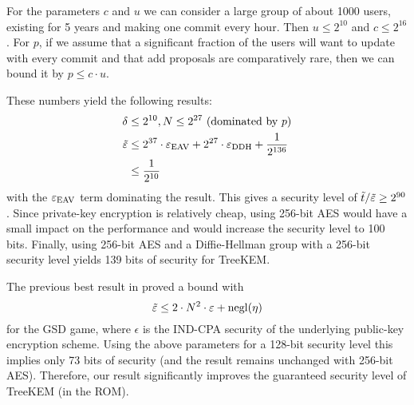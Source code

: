 For the parameters $c$ and $u$ we can consider a large group of about 1000 users, existing for 5 years and making one commit every hour. Then $u \le 2^{10}$ and $c \le 2^{16}$. For $p$, if we assume that a significant fraction of the users will want to update with every commit and that add proposals are comparatively rare, then we can bound it by $p \le c \cdot u$.

These numbers yield the following results:
\begin{align*}
	\delta & \le 2^{10}, N \le 2^{27}                                                      \text{ (dominated by $p$)} \\
	\tilde{\varepsilon}    & \le 2^{37} \cdot \varepsilon_\mathrm{EAV} + 2^{27} \cdot \varepsilon_\mathrm{DDH} + \frac{1}{2^{136}}                                          \\
	       & \le \frac{1}{2^{10}}
\end{align*}
with the $\varepsilon_\mathrm{EAV}$ term dominating the result. This gives a security level of $\tilde{t}/\tilde{\varepsilon} \ge 2^{90}$. Since private-key encryption is relatively cheap, using 256-bit AES would have a small impact on the performance and would increase the security level to 100 bits. Finally, using 256-bit AES and a Diffie-Hellman group with a 256-bit security level yields 139 bits of security for TreeKEM.

The previous best result in \cite[Theorem 3]{ttkem} proved a bound with
\[
	\tilde{\varepsilon} \le 2 \cdot N^2 \cdot \varepsilon + \mathrm{negl}(\eta)
\]
for the GSD game, where $\epsilon$ is the IND-CPA security of the underlying public-key encryption scheme. Using the above parameters for a 128-bit security level this implies only 73 bits of security (and the result remains unchanged with 256-bit AES). Therefore, our result significantly improves the guaranteed security level of TreeKEM (in the ROM).
